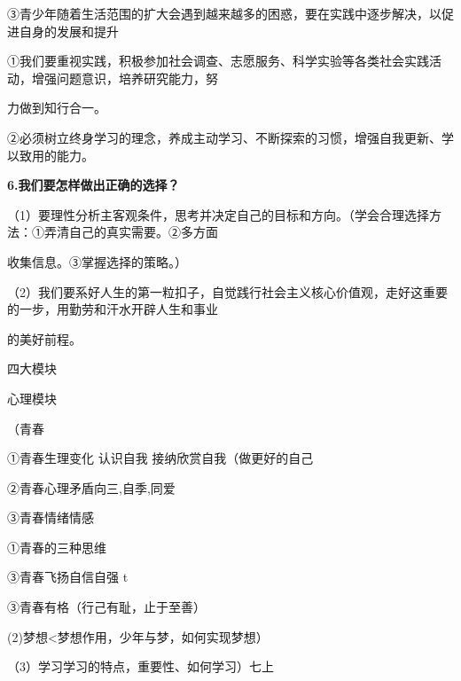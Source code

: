 \documentclass[lang=cn,11pt]{elegantbook}
\newcommand{\daofasym}[1]{{\daofasymbolfont #1}}
\newcommand{\daofasym}[1]{#1}
\begin{document}
\daofasym{③}青少年随着生活范围的扩大会遇到越来越多的困惑，要在实践中逐步解决，以促进自身的发展和提升\par

\daofasym{①}我们要重视实践，积极参加社会调查、志愿服务、科学实验等各类社会实践活动，增强问题意识，培养研究能力，努\par

力做到知行合一。\par

\daofasym{②}必须树立终身学习的理念，养成主动学习、不断探索的习惯，增强自我更新、学以致用的能力。\par

\textbf{6.我们要怎样做出正确的选择？}\par

（1）要理性分析主客观条件，思考并决定自己的目标和方向。（学会合理选择方法：\daofasym{①}弄清自己的真实需要。\daofasym{②}多方面\par

收集信息。\daofasym{③}掌握选择的策略。）\par

（2）我们要系好人生的第一粒扣子，自觉践行社会主义核心价值观，走好这重要的一步，用勤劳和汗水开辟人生和事业\par

的美好前程。\par

四大模块\par

心理模块\par

（青春\par

\daofasym{①}青春生理变化 认识自我 接纳欣赏自我（做更好的自己\par

\daofasym{②}青春心理矛盾向三,自季,同爱\par

\daofasym{③}青春情绪情感\par

\daofasym{①}青春的三种思维\par

\daofasym{③}青春飞扬自信自强 t\par

\daofasym{③}青春有格（行己有耻，止于至善）\par

(2)梦想<梦想作用，少年与梦，如何实现梦想）\par

（3）学习学习的特点，重要性、如何学习）七上\par
\end{document}
